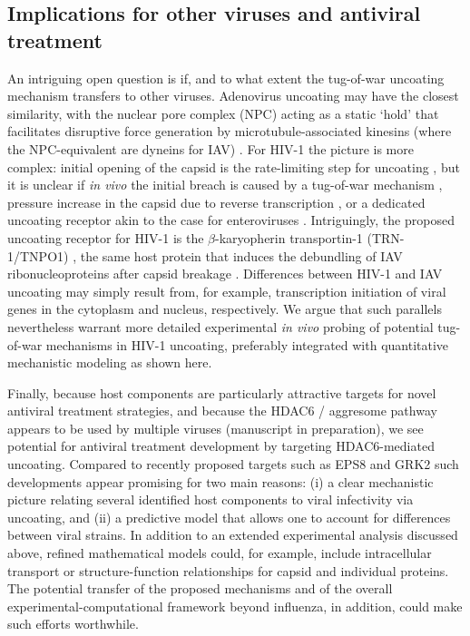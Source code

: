 \subsection{Implications for other viruses and antiviral treatment}

An intriguing open question is if, and to what extent the tug-of-war uncoating mechanism transfers to other viruses. Adenovirus uncoating may have the closest similarity, with the nuclear pore complex (NPC) acting as a static ‘hold’ that facilitates disruptive force generation by microtubule-associated kinesins (where the NPC-equivalent are dyneins for IAV) \cite{flatt2019adenovirus,greber2019adenovirus}. For HIV-1 the picture is more complex: initial opening of the capsid is the rate-limiting step for uncoating \cite{marquez2018kinetics}, but it is unclear if \textit{in vivo} the initial breach is caused by a tug-of-war mechanism \cite{rawle2018toward}, pressure increase in the capsid due to reverse transcription \cite{rankovic2017reverse}, or a dedicated uncoating receptor akin to the case for enteroviruses \cite{zhao2019human}. Intriguingly, the proposed uncoating receptor for HIV-1 is the $\beta$-karyopherin transportin-1 (TRN-1/TNPO1) \cite{fernandez2019transportin}, the same host protein that induces the debundling of IAV ribonucleoproteins after capsid breakage \cite{miyake2019influenza, yamauchi2020influenza}. Differences between HIV-1 and IAV uncoating may simply result from, for example, transcription initiation of viral genes in the cytoplasm and nucleus, respectively. We argue that such parallels nevertheless warrant more detailed experimental \textit{in vivo} probing of potential tug-of-war mechanisms in HIV-1 uncoating, preferably integrated with quantitative mechanistic modeling as shown here.

Finally, because host components are particularly attractive targets for novel antiviral treatment strategies, and because the HDAC6 / aggresome pathway appears to be used by multiple viruses (manuscript in preparation), we see potential for antiviral treatment development by targeting HDAC6-mediated uncoating. Compared to recently proposed targets such as EPS8 \cite{larson2019eps8} and GRK2 \cite{yanguez2018phosphoproteomic} such developments appear promising for two main reasons: (i) a clear mechanistic picture relating several identified host components to viral infectivity via uncoating, and (ii) a predictive model that allows one to account for differences between viral strains. In addition to an extended experimental analysis discussed above, refined mathematical models could, for example, include intracellular transport or structure-function relationships for capsid and individual proteins. The potential transfer of the proposed mechanisms and of the overall experimental-computational framework beyond influenza, in addition, could make such efforts worthwhile.
